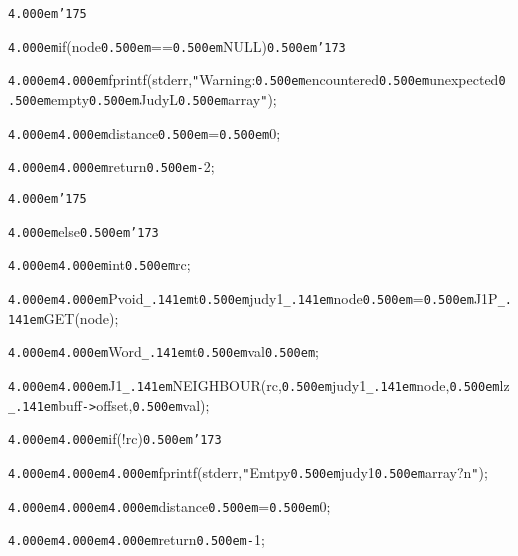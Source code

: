 \noindent
{}{\tt\mc \kern4.000em}{\tt\char'175}

\noindent
{}\hfill

\noindent
{}{\tt\mc \kern4.000em}if(node{\tt\mc \kern0.500em}=={\tt\mc \kern0.500em}NULL){\tt\mc \kern0.500em}{\tt\char'173}

\noindent
{}{\tt\mc \kern4.000em}{\tt\mc \kern4.000em}fprintf(stderr,{\tt "}Warning:{\tt\mc \kern0.500em}encountered{\tt\mc \kern0.500em}unexpected{\tt\mc \kern0.500em}empty{\tt\mc \kern0.500em}JudyL{\tt\mc \kern0.500em}array{\tt "});

\noindent
{}{\tt\mc \kern4.000em}{\tt\mc \kern4.000em}{\tt *}distance{\tt\mc \kern0.500em}={\tt\mc \kern0.500em}0;

\noindent
{}{\tt\mc \kern4.000em}{\tt\mc \kern4.000em}return{\tt\mc \kern0.500em}{\tt -}2;

\noindent
{}{\tt\mc \kern4.000em}{\tt\char'175}

\noindent
{}{\tt\mc \kern4.000em}else{\tt\mc \kern0.500em}{\tt\char'173}

\noindent
{}{\tt\mc \kern4.000em}{\tt\mc \kern4.000em}int{\tt\mc \kern0.500em}rc;

\noindent
{}{\tt\mc \kern4.000em}{\tt\mc \kern4.000em}Pvoid{\tt\_\kern.141em}t{\tt\mc \kern0.500em}judy1{\tt\_\kern.141em}node{\tt\mc \kern0.500em}={\tt\mc \kern0.500em}J1P{\tt\_\kern.141em}GET({\tt *}node);

\noindent
{}{\tt\mc \kern4.000em}{\tt\mc \kern4.000em}Word{\tt\_\kern.141em}t{\tt\mc \kern0.500em}val{\tt\mc \kern0.500em};

\noindent
{}\hfill

\noindent
{}{\tt\mc \kern4.000em}{\tt\mc \kern4.000em}J1{\tt\_\kern.141em}NEIGHBOUR(rc,{\tt\mc \kern0.500em}judy1{\tt\_\kern.141em}node,{\tt\mc \kern0.500em}lz{\tt\_\kern.141em}buff{\tt -}{\tt >}offset,{\tt\mc \kern0.500em}val);

\noindent
{}\hfill

\noindent
{}{\tt\mc \kern4.000em}{\tt\mc \kern4.000em}if(!rc){\tt\mc \kern0.500em}{\tt\char'173}

\noindent
{}{\tt\mc \kern4.000em}{\tt\mc \kern4.000em}{\tt\mc \kern4.000em}fprintf(stderr,{\tt "}Emtpy{\tt\mc \kern0.500em}judy1{\tt\mc \kern0.500em}array?{\tt{}}n{\tt "});

\noindent
{}{\tt\mc \kern4.000em}{\tt\mc \kern4.000em}{\tt\mc \kern4.000em}{\tt *}distance{\tt\mc \kern0.500em}={\tt\mc \kern0.500em}0;

\noindent
{}{\tt\mc \kern4.000em}{\tt\mc \kern4.000em}{\tt\mc \kern4.000em}return{\tt\mc \kern0.500em}{\tt -}1;

